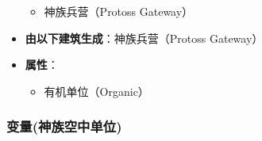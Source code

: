 \begin{tcolorbox}[colback=white, colframe=black!60!white, title=Protoss\_Zealot(), arc=0mm]
\begin{itemize}
            \begin{itemize}
                \item 神族兵营（Protoss Gateway）
            \end{itemize}
        \item \textbf{由以下建筑生成}：神族兵营（Protoss Gateway）
        \item \textbf{属性}：
            \begin{itemize}
                \item 有机单位（Organic）
            \end{itemize}
    \end{itemize}
\end{tcolorbox}

\subsubsection{变量(神族空中单位)}

